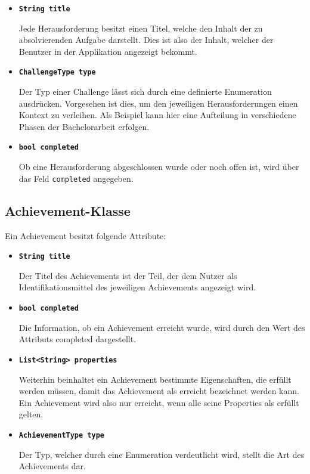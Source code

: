 \documentclass[bibliography=totoc,listof=totoc,BCOR=5mm,DIV=12,oneside]{scrbook}
\begin{document}
{\begin{itemize}
\item[] \texttt{\textbf{String title}}
\par Jede Herausforderung besitzt einen Titel, welche den Inhalt der zu absolvierenden Aufgabe darstellt. Dies ist also der Inhalt, welcher der Benutzer in der Applikation angezeigt bekommt.
\item[] \texttt{\textbf{ChallengeType type}}
\par Der Typ einer Challenge lässt sich durch eine definierte Enumeration ausdrücken. Vorgesehen ist dies, um den jeweiligen Herausforderungen einen Kontext zu verleihen. Als Beispiel kann hier eine Aufteilung in verschiedene Phasen der Bachelorarbeit erfolgen.
\item[] \texttt{\textbf{bool completed}}
\par Ob eine Herausforderung abgeschlossen wurde oder noch offen ist, wird über das Feld \texttt{completed} angegeben.
\end{itemize}

\subsection{Achievement-Klasse}
\par Ein Achievement besitzt folgende Attribute:

\begin{itemize}
\item[] \texttt{\textbf{String title}}
\par Der Titel des Achievements ist der Teil, der dem Nutzer als Identifikationsmittel des jeweiligen Achievements angezeigt wird.  

\item[] \texttt{\textbf{bool completed}}
\par Die Information, ob ein Achievement erreicht wurde, wird durch den Wert des Attributs completed dargestellt.

\item[] \texttt{\textbf{List<String> properties}}
\par Weiterhin beinhaltet ein Achievement bestimmte Eigenschaften, die erfüllt werden müssen, damit das Achievement als erreicht bezeichnet werden kann. Ein Achievement wird also nur erreicht, wenn alle seine Properties als erfüllt gelten.  

\item[] \texttt{\textbf{AchievementType type}}
\par Der Typ, welcher durch eine Enumeration verdeutlicht wird, stellt die Art des Achievements dar.
\end{itemize}

}
\end{document}
